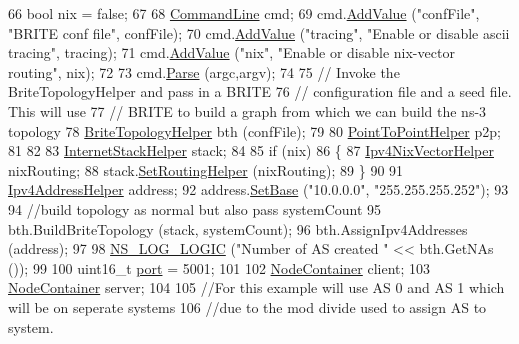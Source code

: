 \begin{DoxyCode}
66   \textcolor{keywordtype}{bool} nix = \textcolor{keyword}{false};
67 
68   \hyperlink{classns3_1_1CommandLine}{CommandLine} cmd;
69   cmd.\hyperlink{classns3_1_1CommandLine_addcfb546c7ad4c8bd0965654d55beb8e}{AddValue} (\textcolor{stringliteral}{"confFile"}, \textcolor{stringliteral}{"BRITE conf file"}, confFile);
70   cmd.\hyperlink{classns3_1_1CommandLine_addcfb546c7ad4c8bd0965654d55beb8e}{AddValue} (\textcolor{stringliteral}{"tracing"}, \textcolor{stringliteral}{"Enable or disable ascii tracing"}, tracing);
71   cmd.\hyperlink{classns3_1_1CommandLine_addcfb546c7ad4c8bd0965654d55beb8e}{AddValue} (\textcolor{stringliteral}{"nix"}, \textcolor{stringliteral}{"Enable or disable nix-vector routing"}, nix);
72 
73   cmd.\hyperlink{classns3_1_1CommandLine_a5c10b85b3207e5ecb48d907966923156}{Parse} (argc,argv);
74 
75   \textcolor{comment}{// Invoke the BriteTopologyHelper and pass in a BRITE}
76   \textcolor{comment}{// configuration file and a seed file. This will use}
77   \textcolor{comment}{// BRITE to build a graph from which we can build the ns-3 topology}
78   \hyperlink{classns3_1_1BriteTopologyHelper}{BriteTopologyHelper} bth (confFile);
79 
80   \hyperlink{classns3_1_1PointToPointHelper}{PointToPointHelper} p2p;
81 
82 
83   \hyperlink{classns3_1_1InternetStackHelper}{InternetStackHelper} stack;
84 
85   \textcolor{keywordflow}{if} (nix)
86     \{
87       \hyperlink{classns3_1_1Ipv4NixVectorHelper}{Ipv4NixVectorHelper} nixRouting;
88       stack.\hyperlink{classns3_1_1InternetStackHelper_a3e382c02df022dec79952a7eca8cd5ba}{SetRoutingHelper} (nixRouting);
89     \}
90 
91   \hyperlink{classns3_1_1Ipv4AddressHelper}{Ipv4AddressHelper} address;
92   address.\hyperlink{classns3_1_1Ipv4AddressHelper_acf7b16dd25bac67e00f5e25f90a9a035}{SetBase} (\textcolor{stringliteral}{"10.0.0.0"}, \textcolor{stringliteral}{"255.255.255.252"});
93 
94   \textcolor{comment}{//build topology as normal but also pass systemCount}
95   bth.BuildBriteTopology (stack, systemCount);
96   bth.AssignIpv4Addresses (address);
97 
98   \hyperlink{group__logging_ga88acd260151caf2db9c0fc84997f45ce}{NS\_LOG\_LOGIC} (\textcolor{stringliteral}{"Number of AS created "} << bth.GetNAs ());
99 
100   uint16\_t \hyperlink{dsdv-manet_8cc_a8e0798404bf2cf5dabb84c5ba9a4f236}{port} = 5001;
101 
102   \hyperlink{classns3_1_1NodeContainer}{NodeContainer} client;
103   \hyperlink{classns3_1_1NodeContainer}{NodeContainer} server;
104 
105   \textcolor{comment}{//For this example will use AS 0 and AS 1 which will be on seperate systems}
106   \textcolor{comment}{//due to the mod divide used to assign AS to system.}

\end{DoxyCode}
